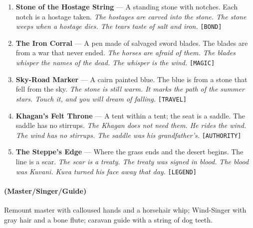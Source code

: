 \begin{enumerate}
\item \textbf{Stone of the Hostage String} --- A standing stone with notches. Each notch is a hostage taken.
  \hfill \textit{The hostages are carved into the stone. The stone weeps when a hostage dies. The tears taste of salt and iron.} \texttt{[BOND]}
\item[J] \textbf{The Iron Corral} --- A pen made of salvaged sword blades. The blades are from a war that never ended.
  \hfill \textit{The horses are afraid of them. The blades whisper the names of the dead. The whisper is the wind.} \texttt{[MAGIC]}
\item[Q] \textbf{Sky-Road Marker} --- A cairn painted blue. The blue is from a stone that fell from the sky.
  \hfill \textit{The stone is still warm. It marks the path of the summer stars. Touch it, and you will dream of falling.} \texttt{[TRAVEL]}
\item[K] \textbf{Khagan's Felt Throne} --- A tent within a tent; the seat is a saddle. The saddle has no stirrups.
  \hfill \textit{The Khagan does not need them. He rides the wind. The wind has no stirrups. The saddle was his grandfather's.} \texttt{[AUTHORITY]}
\item[A] \textbf{The Steppe's Edge} --- Where the grass ends and the desert begins. The line is a scar.
  \hfill \textit{The scar is a treaty. The treaty was signed in blood. The blood was Kuvani. Kuva turned his face away that day.} \texttt{[LEGEND]}
\end{enumerate}

\paragraph*{(Master/Singer/Guide)} Remount master with calloused hands and a horsehair whip; Wind-Singer with gray hair and a bone flute; caravan guide with a string of dog teeth.


